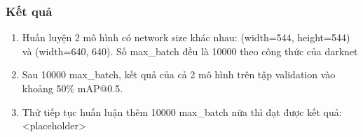 \documentclass[20pt, a4paper]{article}
\begin{document}
\subsubsection{Kết quả}
\begin{enumerate}
	\item Huấn luyện 2 mô hình có network size khác nhau: (width=544, height=544) và (width=640, 640). Số max\_batch đều là 10000 theo công thức của darknet
	\item Sau 10000 max\_batch, kết quả của cả 2 mô hình trên tập validation vào khoảng 50\% mAP@0.5. 
	\item Thử tiếp tục huấn luận thêm 10000 max\_batch nữa thì đạt được kết quả: <placeholder>
\end{enumerate}
\end{document}
